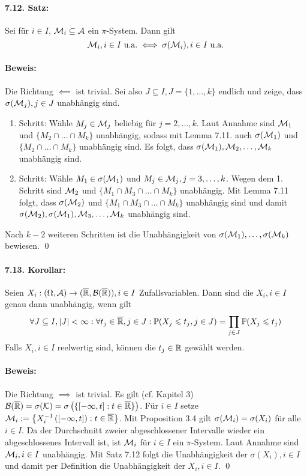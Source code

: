 \documentclass[12pt]{report}
\begin{document}
\paragraph{7.12. Satz:}Sei f\"ur $i\in I$, $\mathcal{M}_i\subseteq\mathcal{A}$ ein $\pi$-System. Dann gilt
$$\mathcal{M}_i,i\in I\text{ u.a.}\iff\sigma(\mathcal{M}_i),i\in I\text{ u.a.}$$

\paragraph{Beweis:}Die Richtung $\impliedby$ ist trivial. Sei also $J\subseteq I,J=\{1,\hdots,k\}$ endlich und zeige, dass $\sigma(\mathcal{M}_j),j\in J$ unabh\"angig sind. 
\begin{enumerate}[label=\arabic*.]
    \item Schritt: W\"ahle $M_j\in\mathcal{M}_j$ beliebig f\"ur $j=2, \hdots,k$. Laut Annahme sind $\mathcal{M}_1$ und $\{M_2\cap\hdots\cap M_k\}$ unabh\"angig, sodass mit Lemma 7.11. auch $\sigma(\mathcal{M}_1)$ und $\{M_2\cap\hdots\cap M_k\}$ unabh\"angig sind. Es folgt, dass $\sigma(\mathcal{M}_1),\mathcal{M}_2,\hdots,\mathcal{M}_k$ unabh\"angig sind.
    \item Schritt: W\"ahle $M_1\in\sigma(\mathcal{M}_1)$ und $M_j\in\mathcal{M}_j,j=3,\hdots,k$. Wegen dem 1. Schritt sind $\mathcal{M}_2$ und $\{M_1\cap M_3\cap\hdots\cap M_k\}$ unabh\"angig. Mit Lemma 7.11 folgt, dass $\sigma(\mathcal{M}_2)$ und $\{M_1\cap M_3\cap\hdots\cap M_k\}$ unabh\"angig sind und damit $\sigma(\mathcal{M}_2),\sigma(\mathcal{M}_1),\mathcal{M}_3,\hdots,\mathcal{M}_k$ unabh\"angig sind. 
\end{enumerate}
Nach $k-2$ weiteren Schritten ist die Unabh\"angigkeit von $\sigma(\mathcal{M}_1),\hdots,\sigma(\mathcal{M}_k)$ bewiesen. \qed

\paragraph{7.13. Korollar:}Seien $X_i:(\Omega,\mathcal{A})\to(\overline{\mathbb{R}},\mathcal{B}(\overline{\mathbb{R}})),i\in I$ Zufallsvariablen. Dann sind die $X_i,i\in I$ genau dann unabh\"angig, wenn gilt
$$\forall J\subseteq I,|J|<\infty:\forall t_j\in\overline{\mathbb{R}},j\in J:\mathbb{P}(X_j\leqslant t_j,j\in J)=\prod_{j\in J}\mathbb{P}(X_j\leqslant t_j)$$
Falls $X_i,i\in I$  reelwertig sind, k\"onnen die $t_j\in\mathbb{R}$ gew\"ahlt werden. 

\paragraph{Beweis:}Die Richtung $\implies$ ist trivial. Es gilt (cf. Kapitel 3) $\mathcal{B}(\overline{\mathbb{R}})=\sigma(\mathcal{K})=\sigma\left(\{[-\infty,t]:t\in\overline{\mathbb{R}}\}\right)$. F\"ur $i\in I$ setze $\mathcal{M}_i:=\left\{X_i^{-1}\left([-\infty,t]\right):t\in\overline{\mathbb{R}}\right\}$. Mit Proposition 3.4 gilt $\sigma(\mathcal{M}_i)=\sigma(X_i)$ f\"ur alle $i\in I$. Da der Durchschnitt zweier abgeschlossener Intervalle wieder ein abgeschlossenes Intervall ist, ist $\mathcal{M}_i$ f\"ur $i\in I$ ein $\pi$-System. Laut Annahme sind $\mathcal{M}_i,i\in I$ unabh\"angig. Mit Satz 7.12 folgt die Unabh\"angigkeit der $\sigma(X_i),i\in I$ und damit per Definition die Unabh\"angigkeit der $X_i,i\in I$. \qed
\end{document}
